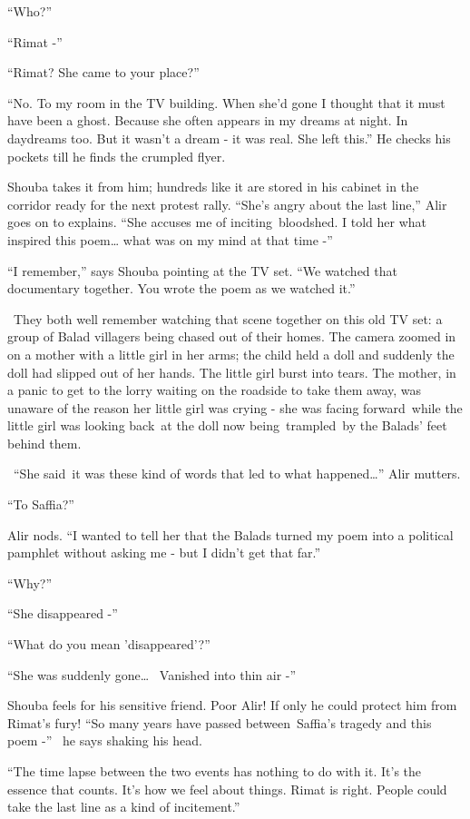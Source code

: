 \documentclass[twoside,11pt]{book}
\begin{document}
``Who?''

``Rimat -''

``Rimat? She came to your place?''

``No. To my room in the TV building. When she'd gone I thought that it must have been a ghost. Because she
often appears in my dreams at night. In daydreams too. But it wasn't a dream - it was real. She left
this.'' He checks his pockets till he finds the crumpled flyer.

Shouba takes it from him; hundreds like it are stored in his cabinet in the corridor ready for the next protest rally.
``She's angry about the last line,'' Alir goes on to explains. ``She accuses me
of inciting~bloodshed. I told her what inspired this poem{\dots} what was on my mind at that time -''

``I remember,'' says Shouba pointing at the TV set. ``We watched that documentary
together. You wrote the poem as we watched it.''

\ They both well remember watching that scene together on this old TV set: a group of Balad villagers being chased out
of their homes. The camera zoomed in on a mother with a little girl in her arms; the child held a doll and suddenly the
doll had slipped out of her hands. The little girl burst into tears. The mother, in a panic to get to the lorry waiting
on the roadside to take them away, was unaware of the reason her little girl was crying - she was facing forward~while
the little girl was looking back~at the doll now being~trampled~by the Balads' feet behind them.

~``She said~it was these kind of words that led to what happened{\dots}'' Alir mutters.

``To Saffia?''

Alir nods. ``I wanted to tell her that the Balads turned my poem into a political pamphlet without asking
me - but I didn't get that far.''

``Why?''

``She disappeared -''

``What do you mean 'disappeared'?''

``She was suddenly gone{\dots} \ Vanished into thin air -''

Shouba feels for his sensitive friend. Poor Alir! If only he could protect him from Rimat's fury! ``So many
years have passed between~Saffia's tragedy and this poem -'' \ he says shaking his head.

``The time lapse between the two events has nothing to do with it. It's the essence that counts. It's how
we feel about things. Rimat is right. People could take the last line as a kind of incitement.''
\end{document}
